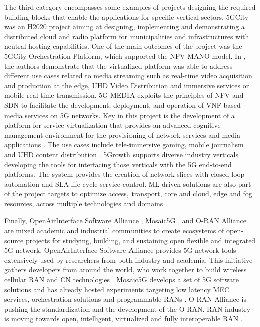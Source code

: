 The third category encompasses some examples of projects designing the required building blocks that enable the applications for specific vertical sectors. 5GCity was an H2020 project aiming at designing, implementing and demonstrating a distributed cloud and radio platform for municipalities and infrastructures with neutral hosting capabilities. One of the main outcomes of the project was the 5GCity Orchestration Platform, which supported the NFV MANO model. In \cite{colman-meixner_deploying_2019}, the authors demonstrate that the virtualized platform was able to address different use cases related to media streaming such as real-time video acquisition and production at the edge, UHD Video Distribution and immersive services or mobile real-time transmission. 5G-MEDIA \cite{noauthor_5g-media_nodate} exploits the principles of NFV and SDN to facilitate the development, deployment, and operation of VNF-based media services on 5G networks. Key in this project is the development of a platform for service virtualization that provides an advanced cognitive management environment for the provisioning of network services and media applications \cite{alvarez_edge--cloud_2019}. The use cases include tele-immersive gaming, mobile journalism and UHD content distribution \cite{breitgand_towards_2018}. 5Growth \cite{noauthor_5growth_nodate} supports diverse industry verticals developing the tools for interfacing those verticals with the 5G end-to-end platforms. The system provides the creation of network slices with closed-loop automation and SLA life-cycle service control. ML-driven solutions are also part of the project targets to optimize access, transport, core and cloud, edge and fog resources, across multiple technologies and domains \cite{li_5growth_2021}.

Finally, OpenAirInterface Software Alliance \cite{noauthor_openairinterface_nodate}, Mosaic5G \cite{noauthor_mosaic5g_nodate}, and O-RAN Alliance \cite{noauthor_o-ran_nodate} are mixed academic and industrial communities to create ecosystems of open-source projects for studying, building, and sustaining open flexible and integrated 5G network.
OpenAirInterface Software Alliance \cite{noauthor_openairinterface_nodate} provides 5G network tools extensively used by researchers from both industry and academia. This initiative gathers developers from around the world, who work together to build wireless cellular RAN and CN technologies \cite{nikaein_openairinterface_2014}.
Mosaic5G \cite{noauthor_mosaic5g_nodate} develops a set of 5G software solutions and has already hosted experiments targeting low latency MEC services, orchestration solutions and programmable RANs \cite{nikaein_mosaic5g_2018}.
O-RAN Alliance \cite{noauthor_o-ran_nodate} is pushing the standardization and the development of the O-RAN. RAN industry is moving towards open, intelligent, virtualized and fully interoperable RAN \cite{openRAN}.




